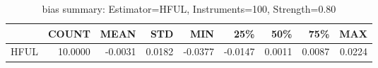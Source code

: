 \begin{table}[ht]
\centering
\caption{bias summary: Estimator=HFUL, Instruments=100, Strength=0.80}
\begin{tabular}{lrrrrrrrr}
\toprule
 & COUNT & MEAN & STD & MIN & 25\% & 50\% & 75\% & MAX \\
\midrule
HFUL & 10.0000 & -0.0031 & 0.0182 & -0.0377 & -0.0147 & 0.0011 & 0.0087 & 0.0224 \\
\bottomrule
\end{tabular}
\end{table}
